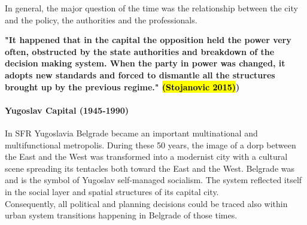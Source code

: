 \documentclass[11pt]{report}
\begin{document}
In general, the major question of the time was the relationship between the city and the policy, the authorities and the professionals.

\textbf{"It happened that in the capital the opposition held the power very often, obstructed by the state authorities and breakdown of the decision making system. When the party in power was changed, it adopts new standards and forced to dismantle all the structures brought up by the previous regime." \hl{(Stojanovic 2015)})}

\paragraph{Yugoslav Capital (1945-1990)}

In SFR Yugoslavia Belgrade became an important multinational and  multifunctional  metropolis. During these 50 years, the image of a dorp between the East and the West was transformed into a modernist city with a cultural scene spreading its tentacles both toward the East and the West. Belgrade was and is the symbol of Yugoslav self-managed socialism. The system reflected itself in the social layer and spatial structures of its capital city.
\\
Consequently, all political and planning decisions could be traced also within urban system transitions happening in Belgrade of those times.
\end{document}
